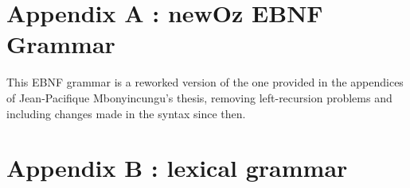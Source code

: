 
\section*{Appendix A : newOz EBNF Grammar}\label{sec:appendix-a}
This EBNF grammar is a reworked version of the one provided in the appendices of Jean-Pacifique Mbonyincungu's thesis, removing left-recursion problems and including changes made in the syntax since then.


\section*{Appendix B : lexical grammar}\label{sec:appendix-b}
